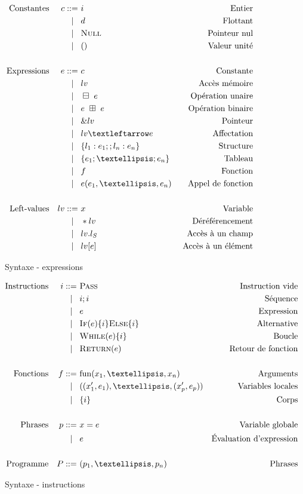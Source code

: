 \begin{figure}

  \begin{align*}
  \gramdef{Constantes}{c}
                 { i      }{ Entier }
                 { d      }{ Flottant }
                 { \eNull }{ Pointeur nul }
                 { \eUnit }{ Valeur unité }
                 {END}
  \\
  \gramdef{Expressions}{e}
                 { c               }{ Constante }
                 { lv              }{ Accès mémoire }
                 { \opun~e         }{ Opération unaire }
                 { e~\opbin~e      }{ Opération binaire }
                 { \& lv           }{ Pointeur }
                 { lv ← e          }{ Affectation }
                 { \{ l_1 : e_1 ;
                    ; l_n : e_n \} }{ Structure }
                 { \{e_1 ;…; e_n\} }{ Tableau }
                 { f               }{ Fonction }
                 { e (e_1, …, e_n) }{ Appel de fonction }
                 {END}
  \\
  \gramdef{Left-values}{lv}
                  { x      }{ Variable }
                  { *lv    }{ Déréférencement }
                  { lv.l_S }{ Accès à un champ }
                  { lv[e]  }{ Accès à un élément }
                  {END}
  \end{align*}

  \caption{Syntaxe - expressions}
  \label{fig:stx-data}
\end{figure}

\begin{figure}

  \begin{align*}
  \gramdef{Instructions}{i}
                 { \iPass        }{Instruction vide}
                 { i;i           }{Séquence}
                 { e             }{Expression}
                 { \iIf{e}{i}{i} }{Alternative}
                 { \iWhile{e}{i} }{Boucle}
                 { \iReturn{e}   }{Retour de fonction}
                 {END}
  \\
  \gramdef{Fonctions}{f}
                 { \mathrm{fun} (x_1, …, x_n)    }{Arguments}
                 { ((x'_1, e_1), …, (x'_p, e_p)) }{Variables locales}
                 { \{ i \}                       }{Corps}
                 {END}
  \\
  \gramdef{Phrases}{p}
                 { x = e }{Variable globale}
                 { e     }{Évaluation d'expression}
                 {END}
  \\
  \gramdef{Programme}{P}
                 { (p_1, …, p_n)}{Phrases}
                 {END}
  \end{align*}

  \caption{Syntaxe - instructions}
  \label{fig:stx}
\end{figure}

